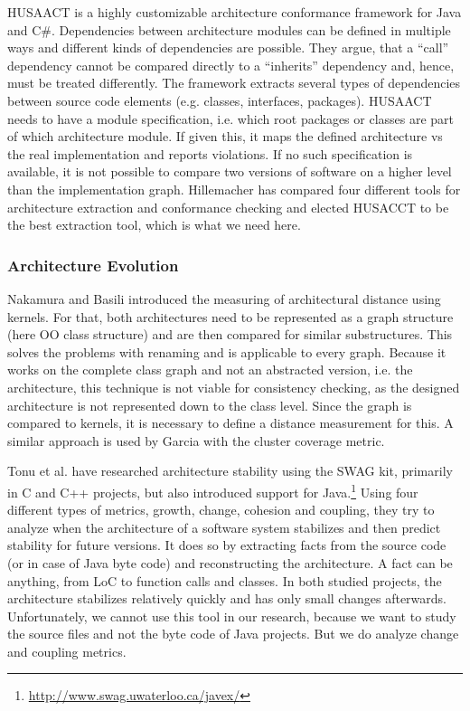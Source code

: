 \documentclass[sigplan, anonymous, review]{acmart}
\begin{document}
HUSAACT \cite{Husacct1,Husacct2} is a highly customizable architecture conformance framework for Java and C\#. Dependencies between architecture modules can be defined in multiple ways and different kinds of dependencies are possible. They argue, that a ``call'' dependency cannot be compared directly to a ``inherits'' dependency and, hence, must be treated differently. 
The framework extracts several types of dependencies between source code elements (e.g. classes, interfaces, packages). HUSAACT needs to have a module specification, i.e. which root packages or classes are part of which architecture module. If given this, it maps the defined architecture vs the real implementation and reports violations.
If no such specification is available, it is not possible to compare two versions of software on a higher level than the implementation graph. 
Hillemacher \cite{MScSteffen} has compared four different tools for architecture extraction and conformance checking and elected HUSACCT to be the best extraction tool, which is what we need here.

\subsubsection{Architecture Evolution}

Nakamura and Basili \cite{StructDist} introduced the measuring of architectural distance using kernels. For that, both architectures need to be represented as a graph structure (here OO class structure) and are then compared for similar substructures. This solves the problems with renaming and is applicable to every graph. 
Because it works on the complete class graph and not an abstracted version, i.e. the architecture, this technique is not viable for consistency checking, as the designed architecture is not represented down to the class level. 
Since the graph is compared to kernels, it is necessary to define a distance measurement for this. A similar approach is used by Garcia \cite{arcade-thesis} with the cluster coverage metric.

Tonu et al. \cite{Swag} have researched architecture stability using the SWAG kit, primarily in C and C++ projects, but also introduced support for Java.\footnote{\url{http://www.swag.uwaterloo.ca/javex/}} Using four different types of metrics, growth, change, cohesion and coupling, they try to analyze when the architecture of a software system stabilizes and then predict stability for future versions. It does so by extracting facts from the source code (or in case of Java byte code) and reconstructing the architecture. A fact can be anything, from LoC to function calls and classes. 
In both studied projects, the architecture stabilizes relatively quickly and has only small changes afterwards. Unfortunately, we cannot use this tool in our research, because we want to study the source files and not the byte code of Java projects. But we do analyze change and coupling metrics.
\end{document}
